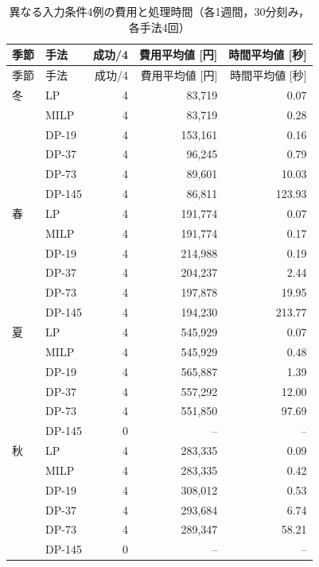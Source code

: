 \documentclass[a4paper,11pt,xelatex,ja=standard]{bxjsarticle}
\begin{document}
\begingroup
\small
\setlength{\tabcolsep}{3pt}
\begin{longtable}{llrrr}
    \caption{異なる入力条件4例の費用と処理時間（各1週間，30分刻み，各手法4回）}\label{tab:season} \\
    \toprule
    季節 & 手法     & 成功/4 & 費用平均値 [円] & 時間平均値 [秒]                      \\
    \midrule
    \endfirsthead
    \toprule
    季節 & 手法     & 成功/4 & 費用平均値 [円] & 時間平均値 [秒]                      \\
    \midrule
    \endhead
    冬  & LP     & 4    & 83,719    & 0.07                           \\
       & MILP   & 4    & 83,719    & 0.28                           \\
       & DP-19  & 4    & 153,161   & 0.16                           \\
       & DP-37  & 4    & 96,245    & 0.79                           \\
       & DP-73  & 4    & 89,601    & 10.03                          \\
       & DP-145 & 4    & 86,811    & 123.93                         \\
    \midrule
    春  & LP     & 4    & 191,774   & 0.07                           \\
       & MILP   & 4    & 191,774   & 0.17                           \\
       & DP-19  & 4    & 214,988   & 0.19                           \\
       & DP-37  & 4    & 204,237   & 2.44                           \\
       & DP-73  & 4    & 197,878   & 19.95                          \\
       & DP-145 & 4    & 194,230   & 213.77                         \\
    \midrule
    夏  & LP     & 4    & 545,929   & 0.07                           \\
       & MILP   & 4    & 545,929   & 0.48                           \\
       & DP-19  & 4    & 565,887   & 1.39                           \\
       & DP-37  & 4    & 557,292   & 12.00                          \\
       & DP-73  & 4    & 551,850   & 97.69                          \\
       & DP-145 & 0    & --        & --                             \\
    \midrule
    秋  & LP     & 4    & 283,335   & 0.09                           \\
       & MILP   & 4    & 283,335   & 0.42                           \\
       & DP-19  & 4    & 308,012   & 0.53                           \\
       & DP-37  & 4    & 293,684   & 6.74                           \\
       & DP-73  & 4    & 289,347   & 58.21                          \\
       & DP-145 & 0    & --        & --                             \\
    \bottomrule
\end{longtable}
\end{document}
